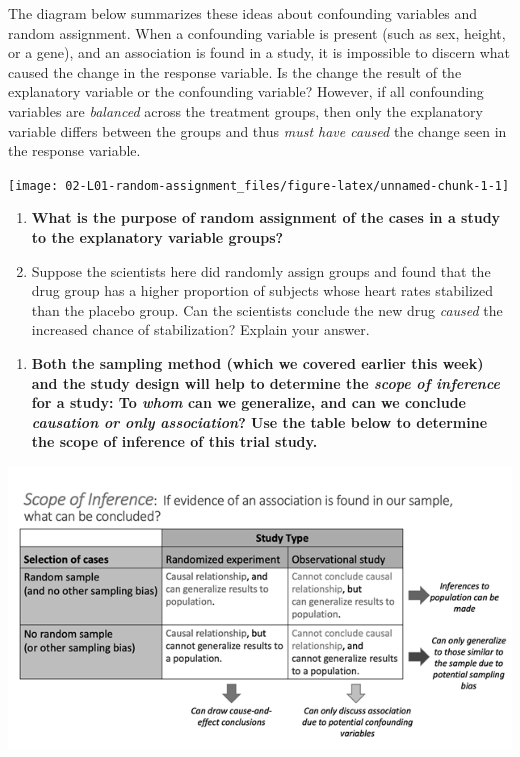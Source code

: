 \documentclass[
]{report}
\providecommand{\tightlist}{%
  \setlength{\itemsep}{0pt}\setlength{\parskip}{0pt}}
\begin{document}
The diagram below summarizes these ideas about confounding variables and random assignment. When a confounding variable is present (such as sex, height, or a gene), and an association is found in a study, it is impossible to discern what caused the change in the response variable. Is the change the result of the explanatory variable or the confounding variable? However, if all confounding variables are \emph{balanced} across the treatment groups, then only the explanatory variable differs between the groups and thus \emph{must have caused} the change seen in the response variable.

\begin{center}\texttt{[image: 02-L01-random-assignment\_files/figure-latex/unnamed-chunk-1-1]} \end{center}

\begin{enumerate}
\def\labelenumi{\arabic{enumi}.}
\setcounter{enumi}{15}
\item
  \textbf{What is the purpose of random assignment of the cases in a study to the explanatory variable groups?}
  \vspace{0.8in}
\item
  Suppose the scientists here did randomly assign groups and found that the drug group has a higher proportion of subjects whose heart rates stabilized than the placebo group. Can the scientists conclude the new drug \emph{caused} the increased chance of stabilization? Explain your answer.
  \vspace{0.5in}
\end{enumerate}

\newpage

\begin{enumerate}
\def\labelenumi{\arabic{enumi}.}
\setcounter{enumi}{17}
\tightlist
\item
  \textbf{Both the sampling method (which we covered earlier this week) and the study design will help to determine the \emph{scope of inference} for a study: To \emph{whom} can we generalize, and can we conclude \emph{causation or only association}? Use the table below to determine the scope of inference of this trial study.}
  \vspace{0.3in}
\end{enumerate}

\begin{center}\includegraphics[width=0.75\linewidth]{images/ScopeOfInferenceGreyscale} \end{center}
\end{document}
